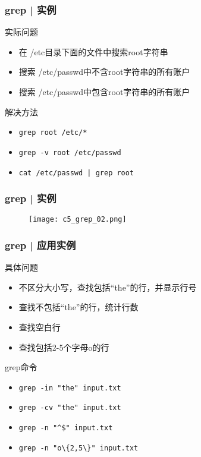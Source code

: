 \begin{frame}[fragile]
  \frametitle{grep | \alert{实例}}
  \begin{block}{实际问题}
    \begin{itemize}
      \item<2-> 在 /etc目录下面的文件中搜索root字符串
      \item<4-> 搜索 /etc/passwd中不含root字符串的所有账户
      \item<6-> 搜索 /etc/passwd中包含root字符串的所有账户
    \end{itemize}
  \end{block}
  \begin{block}{解决方法}
    \begin{itemize}
      \item<3-> \verb|grep root /etc/*|
      \item<5-> \verb|grep -v root /etc/passwd|
      \item<7-> \verb=cat /etc/passwd | grep root=
    \end{itemize}
  \end{block}
\end{frame}

\begin{frame}
  \frametitle{grep | 实例}
  \begin{figure}
    \centering
    \texttt{[image: c5\_grep\_02.png]}
  \end{figure}
\end{frame}

\begin{frame}[fragile]
  \frametitle{grep | \alert{应用实例}}
  \begin{block}{具体问题}
    \begin{itemize}
      \item<2-> 不区分大小写，查找包括“the”的行，并显示行号
      \item<4-> 查找不包括“the”的行，统计行数
      \item<6-> 查找空白行
      \item<8-> 查找包括2-5个字母o的行
    \end{itemize}
  \end{block}
  \begin{block}{grep命令}
    \begin{itemize}
      \item<3-> \verb|grep -in "the" input.txt|
      \item<5-> \verb|grep -cv "the" input.txt|
      \item<7-> \verb|grep -n "^$" input.txt|
      \item<9-> \verb|grep -n "o\{2,5\}" input.txt|
    \end{itemize}
  \end{block}
\end{frame}

